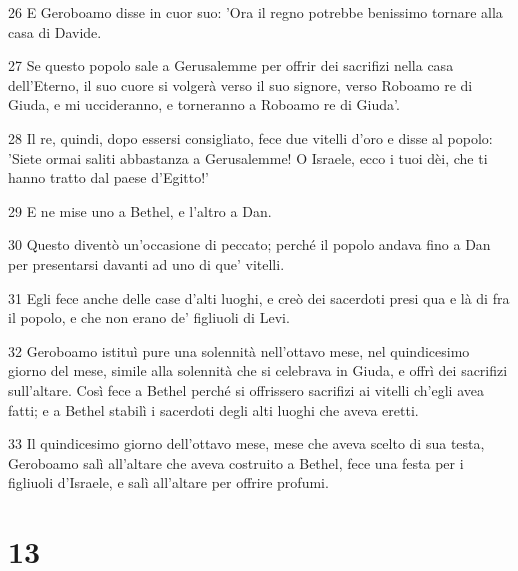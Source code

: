 \par 26 E Geroboamo disse in cuor suo: 'Ora il regno potrebbe benissimo tornare alla casa di Davide.
\par 27 Se questo popolo sale a Gerusalemme per offrir dei sacrifizi nella casa dell'Eterno, il suo cuore si volgerà verso il suo signore, verso Roboamo re di Giuda, e mi uccideranno, e torneranno a Roboamo re di Giuda'.
\par 28 Il re, quindi, dopo essersi consigliato, fece due vitelli d'oro e disse al popolo: 'Siete ormai saliti abbastanza a Gerusalemme! O Israele, ecco i tuoi dèi, che ti hanno tratto dal paese d'Egitto!'
\par 29 E ne mise uno a Bethel, e l'altro a Dan.
\par 30 Questo diventò un'occasione di peccato; perché il popolo andava fino a Dan per presentarsi davanti ad uno di que' vitelli.
\par 31 Egli fece anche delle case d'alti luoghi, e creò dei sacerdoti presi qua e là di fra il popolo, e che non erano de' figliuoli di Levi.
\par 32 Geroboamo istituì pure una solennità nell'ottavo mese, nel quindicesimo giorno del mese, simile alla solennità che si celebrava in Giuda, e offrì dei sacrifizi sull'altare. Così fece a Bethel perché si offrissero sacrifizi ai vitelli ch'egli avea fatti; e a Bethel stabilì i sacerdoti degli alti luoghi che aveva eretti.
\par 33 Il quindicesimo giorno dell'ottavo mese, mese che aveva scelto di sua testa, Geroboamo salì all'altare che aveva costruito a Bethel, fece una festa per i figliuoli d'Israele, e salì all'altare per offrire profumi.

\chapter{13}

